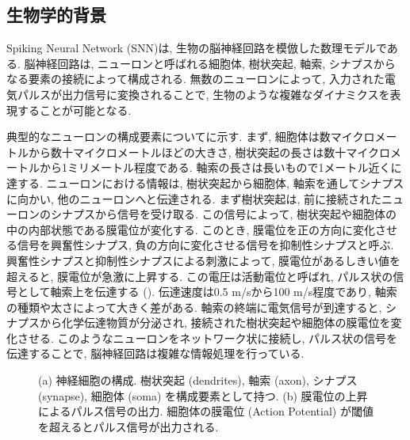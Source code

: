 \subsection{生物学的背景}
Spiking Neural Network (SNN)は, 生物の脳神経回路を模倣した数理モデルである.
脳神経回路は, ニューロンと呼ばれる細胞体, 樹状突起, 軸索, シナプスからなる要素の接続によって構成される.
無数のニューロンによって, 入力された電気パルスが出力信号に変換されることで, 生物のような複雑なダイナミクスを表現することが可能となる.

典型的なニューロンの構成要素についてに示す.
まず, 細胞体は数マイクロメートルから数十マイクロメートルほどの大きさ, 樹状突起の長さは数十マイクロメートルから1ミリメートル程度である.
軸索の長さは長いもので1メートル近くに達する.
ニューロンにおける情報は, 樹状突起から細胞体, 軸索を通してシナプスに向かい, 他のニューロンへと伝達される.
まず樹状突起は, 前に接続されたニューロンのシナプスから信号を受け取る.
この信号によって, 樹状突起や細胞体の中の内部状態である膜電位が変化する.
このとき, 膜電位を正の方向に変化させる信号を興奮性シナプス, 負の方向に変化させる信号を抑制性シナプスと呼ぶ.
興奮性シナプスと抑制性シナプスによる刺激によって, 膜電位があるしきい値を超えると, 膜電位が急激に上昇する.
この電圧は活動電位と呼ばれ, パルス状の信号として軸索上を伝達する ().
伝達速度は0.5 m/sから100 m/s程度であり, 軸索の種類や太さによって大きく差がある.
軸索の終端に電気信号が到達すると, シナプスから化学伝達物質が分泌され, 接続された樹状突起や細胞体の膜電位を変化させる.
このようなニューロンをネットワーク状に接続し, パルス状の信号を伝達することで, 脳神経回路は複雑な情報処理を行っている.

\begin{figure}[htbp]
    \centering

    \begin{minipage}{0.497\textwidth}
        \centering
        
        \label{fig:brain:neuron}
    \end{minipage}
    \hspace{0.02\textwidth}
    \begin{minipage}{0.3474\textwidth}
        \centering
        
        \label{fig:brain:actionpotential}
    \end{minipage}

    \caption[脳神経回路の模式図]{
        \cite{lobo2020spiking}
        (a) 神経細胞の構成. 
        樹状突起 (dendrites), 軸索 (axon), シナプス (synapse), 細胞体 (soma) を構成要素として持つ.
        (b) 膜電位の上昇によるパルス信号の出力.
        細胞体の膜電位 (Action Potential) が閾値を超えるとパルス信号が出力される.
    }
\end{figure}